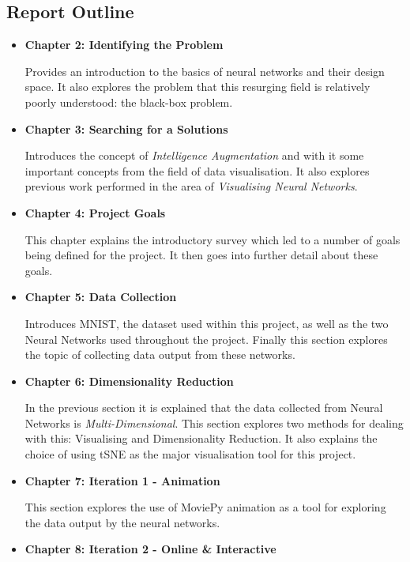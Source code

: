 \documentclass[a4paper,11pt,titlepage]{article}
\begin{document}
	\subsection{Report Outline}
	\begin{itemize}
	\item \textbf{Chapter 2: Identifying the Problem} 
	\par 
	Provides an introduction to the basics of neural networks and their design space. It also explores the problem that this resurging field is relatively poorly understood: the black-box problem.
	\par
	\item \textbf{Chapter 3: Searching for a Solutions}
	\par 
	Introduces the concept of \textit{Intelligence Augmentation} and with it some important concepts from the field of data visualisation. It also explores previous work performed in the area of \textit{Visualising Neural Networks}.
	\par
	\item \textbf{Chapter 4: Project Goals}
	\par 
	This chapter explains the introductory survey which led to a number of goals being defined for the project. It then goes into further detail about these goals. 
	\par
	\item \textbf{Chapter 5: Data Collection}
	\par 
	Introduces MNIST, the dataset used within this project, as well as the two Neural Networks used throughout the project. Finally this section explores the topic of collecting data output from these networks.
	\par
	\item \textbf{Chapter 6: Dimensionality Reduction}
	\par 
	In the previous section it is explained that the data collected from Neural Networks is \textit{Multi-Dimensional}. This section explores two methods for dealing with this: Visualising and Dimensionality Reduction. It also explains the choice of using tSNE as the major visualisation tool for this project.
	\par	
	\item \textbf{Chapter 7: Iteration 1 - Animation}
	\par 
	This section explores the use of MoviePy animation as a tool for exploring the data output by the neural networks.
	\item \textbf{Chapter 8: Iteration 2 - Online \& Interactive}

\end{itemize}
\end{document}
